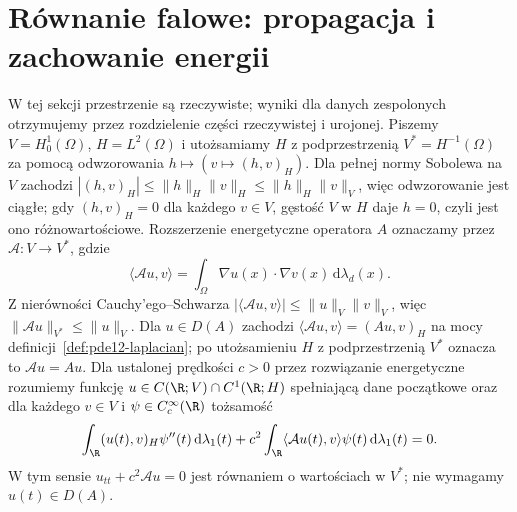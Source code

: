 \section{Równanie falowe: propagacja i zachowanie energii}
\label{sec:pde12-wave}

W tej sekcji przestrzenie są rzeczywiste; wyniki dla
danych zespolonych otrzymujemy przez rozdzielenie części
rzeczywistej i urojonej. Piszemy $V=H_0^1(\Omega)$,
$H=L^2(\Omega)$ i utożsamiamy
$H$ z podprzestrzenią $V^*=H^{-1}(\Omega)$ za pomocą
odwzorowania $h\mapsto(v\mapsto(h,v)_H)$.
Dla pełnej normy Sobolewa na $V$ zachodzi
$|(h,v)_H|\le\|h\|_H\|v\|_H\le\|h\|_H\|v\|_V$,
więc odwzorowanie jest ciągłe; gdy $(h,v)_H=0$
dla każdego $v\in V$, gęstość $V$ w $H$ daje $h=0$,
czyli jest ono różnowartościowe.
Rozszerzenie energetyczne operatora $A$ oznaczamy przez
$\mathcal A:V\to V^*$, gdzie
\[
 \langle\mathcal Au,v\rangle
 =\int_\Omega\nabla u(x)\cdot\nabla v(x)\,\mathrm d\lambda_d(x).
\]
Z nierówności Cauchy'ego--Schwarza
$|\langle\mathcal Au,v\rangle|\le\|u\|_V\|v\|_V$,
więc $\|\mathcal Au\|_{V^*}\le\|u\|_V$.
Dla $u\in D(A)$ zachodzi
$\langle\mathcal Au,v\rangle=(Au,v)_H$ na mocy
definicji~\ref{def:pde12-laplacian}; po utożsamieniu
$H$ z podprzestrzenią $V^*$ oznacza to $\mathcal Au=Au$.
Dla ustalonej prędkości $c>0$ przez rozwiązanie
energetyczne rozumiemy funkcję
$u\in C(\R;V)\cap C^1(\R;H)$ spełniającą dane początkowe
oraz dla każdego $v\in V$ i $\psi\in C_c^\infty(\R)$
tożsamość
\[
 \int_\R (u(t),v)_H\psi''(t)\,\mathrm d\lambda_1(t)
 +c^2\int_\R\langle\mathcal Au(t),v\rangle\psi(t)\,
 \mathrm d\lambda_1(t)=0.
\]
W tym sensie $u_{tt}+c^2\mathcal Au=0$ jest równaniem
o wartościach w $V^*$; nie wymagamy $u(t)\in D(A)$.

